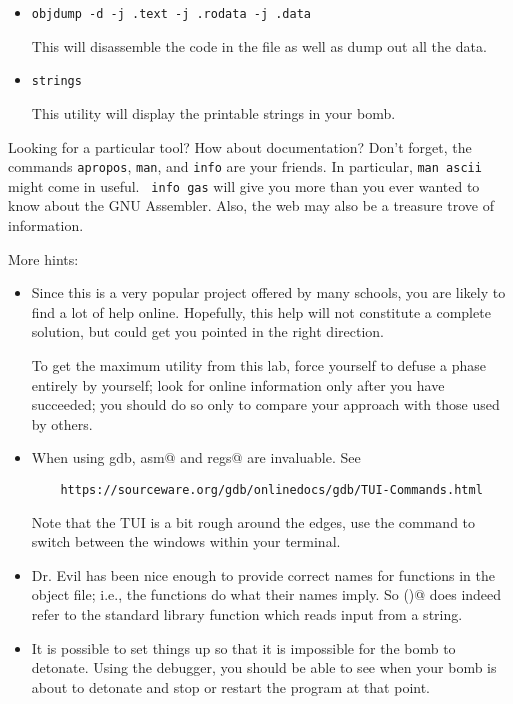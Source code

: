 \documentclass[11pt]{article}
\begin{document}
\begin{itemize}
\item \texttt{objdump -d -j .text -j .rodata -j .data}

This will disassemble the code in the file as well as dump out all the
data.

\item {\tt strings }

This utility will display the printable strings in your bomb.



\end{itemize}

Looking for a particular tool?  How about documentation?  Don't
forget, the commands {\tt apropos}, {\tt man}, and {\tt info} are your
friends.  In particular, {\tt man ascii} might come in useful. {\tt
  info gas} will give you more than you ever wanted to know about the
GNU Assembler. Also, the web may also be a treasure trove of
information.

More hints:

\begin{itemize}
\item Since this is a very popular project offered by many schools, you
  are likely to find a lot of help online.  Hopefully, this help will
  not constitute a complete solution, but could get you pointed in the
  right direction.

  To get the maximum utility from this lab, force yourself to defuse a
  phase entirely by yourself; look for online information only after
  you have succeeded; you should do so only to compare your approach
  with those used by others.

\item When using gdb, \verb@layout asm@ and \verb@layout regs@ are
  invaluable.  See

  \begin{verbatim}
    https://sourceware.org/gdb/onlinedocs/gdb/TUI-Commands.html
  \end{verbatim}

  Note that the TUI is a bit rough around the edges, use the
  \verb@focus@ command to switch between the windows within your
  terminal.

\item Dr. Evil has been nice enough to provide correct names for functions
  in the object file; i.e., the functions do what their names imply.  So
  \verb@sscanf()@ does indeed refer to the standard library function
  which reads input from a string.

\item It is possible to set things up so that it is impossible for the
  bomb to detonate.  Using the debugger, you should be able to see
  when your bomb is about to detonate and stop or restart the program
  at that point.
\end{itemize}
\end{document}

